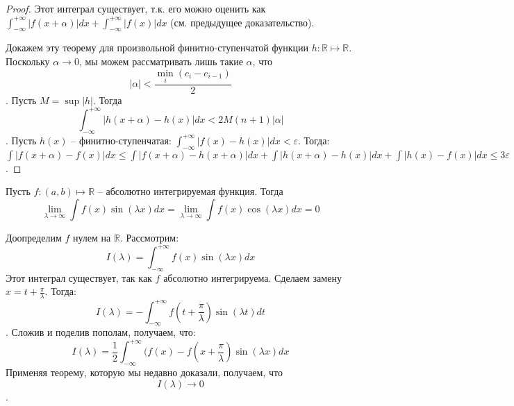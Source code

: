 \documentclass[document.tex]{subfiles}
\begin{document}
\begin{proof}
Этот интеграл существует, т.к. его можно оценить как $\int_{-\infty}^{+\infty}|f(x+\alpha)|dx + \int_{-\infty}^{+\infty}|f(x)|dx$ (см. предыдущее доказательство).

Докажем эту теорему для произвольной финитно-ступенчатой функции $h: \mathbb{R} \mapsto \mathbb{R}$. Поскольку $\alpha \rightarrow 0$, мы можем рассматривать лишь такие $\alpha$, что $$|\alpha| < \frac{\min_i (c_i - c_{i-1})}{2}$$. Пусть $M = \sup |h|$. Тогда 
$$\int_{-\infty}^{+\infty} |h(x + \alpha) - h(x)|dx < 2M(n+1)|\alpha|$$. Пусть $h(x)$ -- финитно-ступенчатая: $\int_{-\infty}^{+\infty}|f(x) - h(x)|dx < \varepsilon$. Тогда:
$\int |f(x+\alpha) - f(x)|dx \leq \int|f(x+\alpha)-h(x+\alpha)|dx + \int|h(x+\alpha)-h(x)|dx + \int|h(x)-f(x)|dx \leq 3\varepsilon$.
\end{proof}

\begin{Lemma}
Пусть $f : (a, b) \mapsto \mathbb{R}$ -- абсолютно интегрируемая функция. Тогда 
$$\lim_{\lambda \rightarrow \infty} \int f(x)\sin (\lambda x)dx = \lim_{\lambda \rightarrow \infty} \int f(x)\cos (\lambda x)dx = 0$$
\end{Lemma}
\begin{Proof}
Доопределим $f$ нулем на $\mathbb{R}$. Рассмотрим:
$$I(\lambda) = \int_{-\infty}^{+\infty}f(x)\sin(\lambda x)dx$$
Этот интеграл существует, так как $f$ абсолютно интегрируема. Сделаем замену $x = t + \frac{\pi}{\lambda}$.
Тогда:
$$I(\lambda) = -\int_{-\infty}^{+\infty}f(t + \frac{\pi}{\lambda})\sin(\lambda t)dt$$.
Сложив и поделив пополам, получаем, что:
$$I(\lambda) = \frac{1}{2} \int_{-\infty}^{+\infty}(f(x) - f(x+\frac{\pi}{\lambda})\sin(\lambda x)dx$$
Применяя теорему, которую мы недавно доказали, получаем, что $$I(\lambda) \rightarrow 0$$.
\end{Proof}
\end{document}
